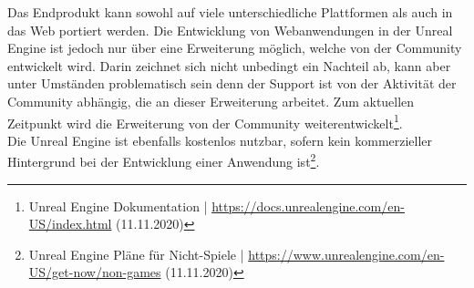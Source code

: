 \documentclass[a4paper,12pt,oneside]{article}
\begin{document}
        Das Endprodukt kann sowohl auf viele unterschiedliche Plattformen 
        als auch in das Web portiert werden. Die Entwicklung von Webanwendungen
        in der Unreal Engine ist jedoch nur über eine Erweiterung möglich, welche von 
        der Community entwickelt wird. Darin zeichnet sich nicht unbedingt ein Nachteil ab, 
        kann aber unter Umständen problematisch sein denn der Support ist von der Aktivität 
        der Community abhängig, die an dieser Erweiterung arbeitet. Zum aktuellen
        Zeitpunkt wird die Erweiterung von der Community weiterentwickelt\footnote{Unreal Engine Dokumentation | \url{https://docs.unrealengine.com/en-US/index.html} (11.11.2020)}. \\
        Die Unreal Engine ist ebenfalls kostenlos nutzbar, sofern kein kommerzieller
        Hintergrund bei der Entwicklung einer Anwendung ist\footnote{Unreal Engine Pläne für Nicht-Spiele | \url{https://www.unrealengine.com/en-US/get-now/non-games} (11.11.2020)}.
\end{document}

